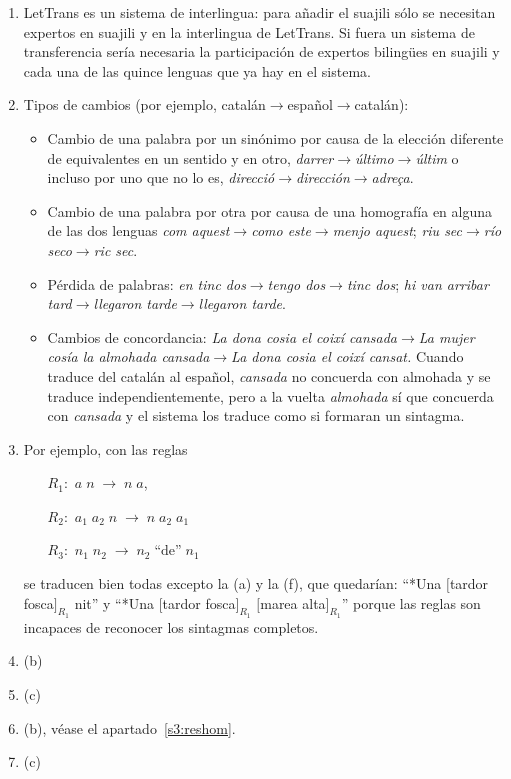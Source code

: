 \begin{enumerate}
\item LetTrans es un sistema de interlingua: para añadir el suajili sólo se necesitan expertos en suajili y en la interlingua de LetTrans. Si fuera un sistema de transferencia sería necesaria la participación de expertos bilingües en suajili y cada una de las quince lenguas que ya hay en el sistema. 

\item Tipos de cambios (por ejemplo, catalán$\to$español$\to$catalán): \begin{itemize} \item Cambio de una palabra por un sinónimo por causa de la elección diferente de equivalentes en un sentido y en otro, \emph{darrer}$\to$\emph{último}$\to$\emph{últim} o incluso por uno que no lo es, \emph{direcció}$\to$\emph{dirección}$\to$\emph{adreça}. \item Cambio de una palabra por otra por causa de una homografía en alguna de las dos lenguas \emph{com aquest}$\to$\emph{como este}$\to$\emph{menjo aquest}; \emph{riu sec}$\to$\emph{río seco}$\to$\emph{ric sec}. \item Pérdida de palabras: \emph{ en tinc dos}$\to$\emph{tengo dos}$\to$\emph{tinc dos}; \emph{ hi van arribar tard}$\to$\emph{llegaron tarde}$\to$\emph{llegaron tarde}. 
\item Cambios de concordancia: \emph{La dona cosia el coixí cansada}$\to$\emph{La mujer cosía la almohada cansada}$\to$\emph{La dona cosia el coixí cansat.} Cuando traduce del catalán al español, \emph{cansada} no concuerda con almohada y se traduce independientemente, pero a la vuelta \emph{almohada} sí que concuerda con \emph{cansada} y el sistema los traduce como si formaran un sintagma. \end{itemize} 

\item Por ejemplo, con las reglas \begin{itemize} \item[$R_1:$] $a \;n\;\to\; n\; a$, \item[$R_2:$] $a_1\; a_2\;n\;\to\; n\; a_2\; a_1$ \item[$R_3:$] $n_1\; n_2\;\to\; n_2\; \mbox{``de''}\; n_1$ \end{itemize} se traducen bien todas excepto la (a) y la (f), que quedarían: ``*Una $[$tardor fosca$]_{R_1}$ nit'' y ``*Una $[$tardor fosca$]_{R_1}$ $[$marea alta$]_{R_1}$'' porque las reglas son incapaces de reconocer los sintagmas completos. 

\item (b) \item (c) \item (b), véase el apartado~\ref{s3:reshom}. \item (c) 


\end{enumerate}
